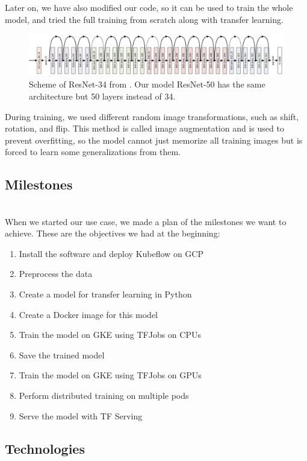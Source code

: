 \documentclass[
	12pt, %
]{fphw}
\begin{document}
Later on, we have also modified our code, so it can be used to train the whole model, and tried the full training from scratch along with transfer learning.

\begin{figure}[H]
	\includegraphics[width=1\textwidth]{resnet.png}
	\caption{Scheme of ResNet-34 from \cite{resnet}. Our model ResNet-50 has the same architecture but 50 layers instead of 34.}
\end{figure}

During training, we used different random image transformations, such as shift, rotation, and flip. This method is called image augmentation and is used to prevent overfitting, so the model cannot just memorize all training images but is forced to learn some generalizations from them.\\

\subsection*{Milestones}
\ \\  

When we started our use case, we made a plan of the milestones we want to achieve. These are the objectives we had at the beginning:
\begin{enumerate}
\item Install the software and deploy Kubeflow on GCP 
\item Preprocess the data
\item Create a model for transfer learning in Python
\item Create a Docker image for this model
\item Train the model on GKE using TFJobs on CPUs
\item Save the trained model
\item Train the model on GKE using TFJobs on GPUs
\item Perform distributed training on multiple pods
\item Serve the model with TF Serving
\end{enumerate}


\subsection*{Technologies}
\ \\ 
\end{document}
